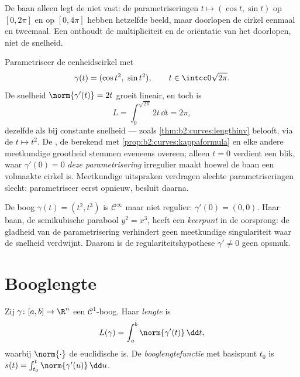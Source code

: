 \begin{remark}
De baan alleen legt de  niet vast: de
parametriseringen $t \mapsto (\cos t, \sin t)$ op $[0, 2\pi]$ en op
$[0, 4\pi]$ hebben hetzelfde beeld, maar doorlopen de cirkel
eenmaal en tweemaal. Een  onthoudt de
multipliciteit en de oriëntatie van het doorlopen, niet de
snelheid.
\end{remark}

\begin{example}\label{ex:b2:curves:speedinvariance}
Parametriseer de eenheidscirkel met
\[
\gamma(t) = (\cos t^2,\ \sin t^2),
\qquad t \in \intcc0{\sqrt{2\pi}} .
\]
De snelheid $\norm{\gamma'(t)} = 2t$ groeit lineair, en toch is
\[
L = \int_0^{\sqrt{2\pi}}2t\,\dd t = 2\pi ,
\]
dezelfde  als bij constante snelheid --- zoals
\cref{thm:b2:curves:lengthinv} belooft, via de
 $t \mapsto t^2$. De , de 
berekend met \cref{prop:b2:curves:kappaformula} en elke andere
meetkundige grootheid stemmen eveneens overeen; alleen $t = 0$
verdient een blik, waar $\gamma'(0) = 0$ \emph{deze
parametrisering} irregulier maakt hoewel de baan een volmaakte
cirkel is. Meetkundige uitspraken verdragen slechte
parametriseringen slecht: parametriseer eerst opnieuw, besluit
daarna.
\end{example}

\begin{example}\label{ex:b2:curves:cusp}
De boog $\gamma(t) = (t^2, t^3)$ is $\mathcal{C}^\infty$ maar niet
regulier: $\gamma'(0) = (0, 0)$. Haar baan, de semikubische
parabool $y^2 = x^3$, heeft een \emph{keerpunt} in de oorsprong: de
gladheid van de parametrisering verhindert geen meetkundige
singulariteit waar de snelheid verdwijnt. Daarom is de
regulariteitshypothese $\gamma' \neq 0$ geen opsmuk.
\end{example}

\section{Booglengte}

\begin{definition}[Booglengte]\label{def:b2:curves:length}
Zij $\gamma \colon [a, b] \to \R^n$ een $\mathcal{C}^1$-boog. Haar
\emph{lengte} is
\[
L(\gamma) = \int_a^b \norm{\gamma'(t)}\, \dd t ,
\]
waarbij $\norm{\cdot}$ de euclidische  is. De
\emph{booglengtefunctie} met basispunt
$t_0$ is $s(t) = \int_{t_0}^t \norm{\gamma'(u)}\,\dd u$.
\end{definition}


